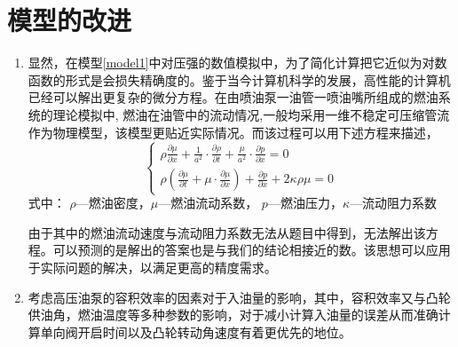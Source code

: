 \documentclass[withoutpreface,bwprint]{cumcmthesis} %
\begin{document}
\section{模型的改进}
\begin{enumerate}
	\item 显然，在模型\ref{model1}中对压强的数值模拟中，为了简化计算把它近似为对数函数的形式是会损失精确度的。鉴于当今计算机科学的发展，高性能的计算机已经可以解出更复杂的微分方程。在由喷油泵一油管一喷油嘴所组成的燃油系统的理论模拟中, 燃油在油管中的流动情况,一般均采用一维不稳定可压缩管流作为物理模型，该模型更贴近实际情况。而该过程可以用下述方程来描述，
	\begin{equation}
	\begin{cases}
	\rho\frac{\partial \mu}{\partial x}+\frac{1}{a^{2}}\cdot\frac{\partial \rho}{\partial t}+\frac{\mu}{a^{2}}\cdot\frac{\partial p}{\partial x} = 0\\
	\rho\left(\frac{\partial \mu}{\partial t}+\mu\cdot \frac{\partial \mu}{\partial x}\right)+\frac{\partial p}{\partial x}+2\kappa\rho\mu = 0
	\end{cases}\label{eq:ques6-1}	
	\end{equation}
	式中： $\rho$—燃油密度，$\mu$—燃油流动系数，
	$p$—燃油压力，$\kappa$—流动阻力系数
	
	由于其中的燃油流动速度与流动阻力系数无法从题目中得到，无法解出该方程。可以预测的是解出的答案也是与我们的结论相接近的数。该思想可以应用于实际问题的解决，以满足更高的精度需求。
	
	\item 考虑高压油泵的容积效率的因素对于入油量的影响，其中，容积效率又与凸轮供油角，燃油温度等多种参数的影响，对于减小计算入油量的误差从而准确计算单向阀开启时间以及凸轮转动角速度有着更优先的地位。

\end{enumerate}
\end{document}
